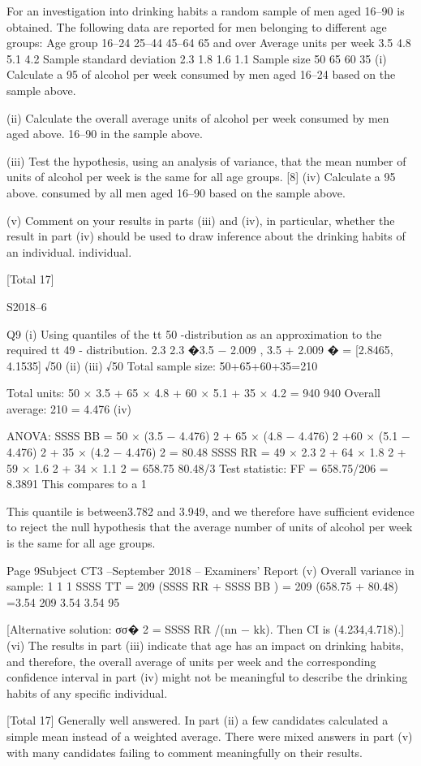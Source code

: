 For an investigation into drinking habits a random sample of men aged 16–90 is
obtained. The following data are reported for men belonging to different age groups:
Age group
16–24 25–44 45–64 65 and over
Average units per week 3.5 4.8 5.1 4.2
Sample standard deviation 2.3 1.8 1.6 1.1
Sample size 50 65 60 35
(i)
Calculate a 95%
of alcohol per week consumed by men aged 16–24 based on the sample above.


(ii) Calculate the overall average units of alcohol per week consumed by men aged
above.
16–90 in the sample above.

(iii) Test the hypothesis, using an analysis of variance, that the mean number of
units of alcohol per week is the same for all age groups. 
[8]
(iv) Calculate a 95%
above.
consumed by all men aged 16–90 based on the sample above.

(v) Comment on your results in parts (iii) and (iv), in particular, whether the result
in part (iv) should be used to draw inference about the drinking habits of an
individual.
individual.

[Total 17]

S2018–6

Q9
(i)
Using quantiles of the tt 50 -distribution as an approximation to the required tt 49 -
distribution.
2.3
2.3
�3.5 − 2.009
, 3.5 + 2.009 � = [2.8465, 4.1535]
√50
(ii)
(iii)
√50
Total sample size: 50+65+60+35=210

Total units: 50 × 3.5 + 65 × 4.8 + 60 × 5.1 + 35 × 4.2 = 940
940
Overall average: 210 = 4.476
(iv)

ANOVA:
SSSS BB = 50 × (3.5 − 4.476) 2 + 65 × (4.8 − 4.476) 2
+60 × (5.1 − 4.476) 2 + 35 × (4.2 − 4.476) 2
= 80.48
SSSS RR = 49 × 2.3 2 + 64 × 1.8 2 + 59 × 1.6 2 + 34 × 1.1 2 = 658.75
80.48/3
Test statistic: FF = 658.75/206 = 8.3891
This compares to a 1%






This quantile is between3.782 and 3.949, and we therefore have sufficient
evidence to reject the null hypothesis that the average number of units of alcohol
per week is the same for all age groups.

Page 9Subject CT3  –September 2018 – Examiners’ Report
(v)
Overall variance in sample:
1
1
1
SSSS TT = 209 (SSSS RR + SSSS BB ) = 209 (658.75 + 80.48) =3.54
209
3.54
3.54
95%


[Alternative solution: σσ� 2 = SSSS RR /(nn − kk). Then CI is (4.234,4.718).]
(vi)
The results in part (iii) indicate that age has an impact on drinking habits,
and therefore, the overall average of units per week and the corresponding
confidence interval in part (iv) might not be meaningful to describe the drinking
habits of any specific individual.

[Total 17]
Generally well answered. In part (ii) a few candidates calculated a
simple mean instead of a weighted average. There were mixed answers
in part (v) with many candidates failing to comment meaningfully on
their results.
